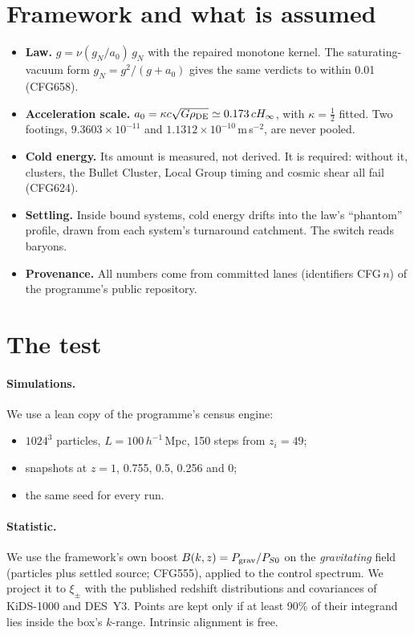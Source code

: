 \documentclass[10pt]{article}
\begin{document}
\section{Framework and what is assumed}
\begin{itemize}
\item \textbf{Law.} $g=\nu(g_N/a_0)\,g_N$ with the repaired monotone kernel. The saturating-vacuum form $g_N=g^2/(g+a_0)$ gives the same verdicts to within 0.01 (CFG658).
\item \textbf{Acceleration scale.} $a_0=\kappa c\sqrt{G\rho_{\rm DE}}\simeq0.173\,cH_\infty$, with $\kappa=\tfrac12$ fitted. Two footings, $9.3603\times10^{-11}$ and $1.1312\times10^{-10}$\,m\,s$^{-2}$, are never pooled.
\item \textbf{Cold energy.} Its amount is measured, not derived. It is required: without it, clusters, the Bullet Cluster, Local Group timing and cosmic shear all fail (CFG624).
\item \textbf{Settling.} Inside bound systems, cold energy drifts into the law's ``phantom'' profile, drawn from each system's turnaround catchment. The switch reads baryons.
\item \textbf{Provenance.} All numbers come from committed lanes (identifiers CFG\,$n$) of the programme's public repository.
\end{itemize}

\section{The test}
\paragraph{Simulations.} We use a lean copy of the programme's census engine:
\begin{itemize}
\item $1024^3$ particles, $L=100\,h^{-1}$\,Mpc, 150 steps from $z_i=49$;
\item snapshots at $z=1$, 0.755, 0.5, 0.256 and 0;
\item the same seed for every run.
\end{itemize}
\paragraph{Statistic.} We use the framework's own boost $B(k,z)=P_{\rm grav}/P_{S0}$ on the \emph{gravitating} field (particles plus settled source; CFG555), applied to the control spectrum. We project it to $\xi_\pm$ with the published redshift distributions and covariances of KiDS-1000 and DES~Y3. Points are kept only if at least 90\% of their integrand lies inside the box's $k$-range. Intrinsic alignment is free.
\end{document}
